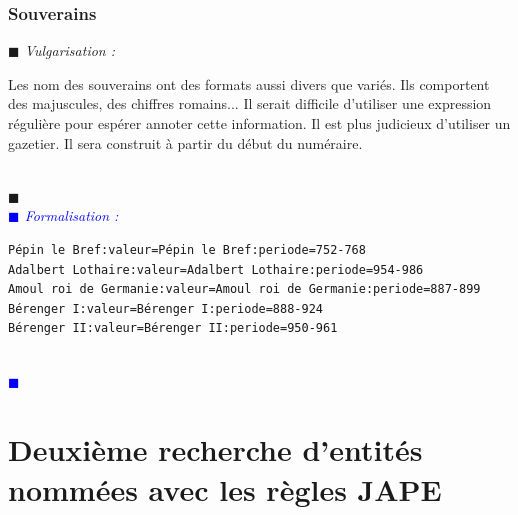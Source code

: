 \documentclass[a4paper, 11pt]{report}
\newenvironment{vulgarisation}
    {
    \textit{\textcolor{dark-blue}{$\blacksquare$  Vulgarisation : \\}}

    }
    {
    ~\\\textcolor{dark-blue}{$\blacksquare$}\\
    }
\newenvironment{formalisation}
    {
    \textit{\textcolor{blue}{$\blacksquare$  Formalisation : \\}}
    }
    {
    ~\\\textcolor{blue}{$\blacksquare$}\\
    }
\begin{document}
\subsubsection{Souverains}
\begin{vulgarisation}
    Les nom des souverains ont des formats aussi divers que variés. Ils comportent des majuscules, des chiffres romains... Il serait difficile d'utiliser une expression régulière pour espérer annoter cette information. Il est plus judicieux d'utiliser un gazetier. Il sera construit à partir du début du numéraire. 
\end{vulgarisation}
\begin{formalisation}
\begin{verbatim}
Pépin le Bref:valeur=Pépin le Bref:periode=752-768
Adalbert Lothaire:valeur=Adalbert Lothaire:periode=954-986
Amoul roi de Germanie:valeur=Amoul roi de Germanie:periode=887-899
Bérenger I:valeur=Bérenger I:periode=888-924
Bérenger II:valeur=Bérenger II:periode=950-961
\end{verbatim}
\end{formalisation}

    \section{Deuxième recherche d'entités nommées avec les règles JAPE}
\end{document}
